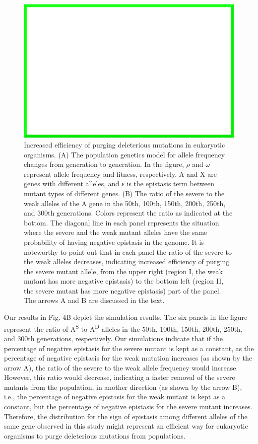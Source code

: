\begin{figure}
\centering
\includegraphics[width=\textwidth]{dummy}
\caption{Increased efficiency of purging deleterious mutations in
eukaryotic organisms. (A) The population genetics model for allele
frequency changes from generation to generation. In the figure, $\rho$
and $\omega$ represent allele frequency and fitness, respectively. A
and X are genes with different alleles, and ε is the epistasis term
between mutant types of different genes. (B) The ratio of the severe
to the weak alleles of the A gene in the 50th, 100th, 150th, 200th,
250th, and 300th generations. Colors represent the ratio as indicated
at the bottom. The diagonal line in each panel represents the
situation where the severe and the weak mutant alleles have the same
probability of having negative epistasis in the genome. It is
noteworthy to point out that in each panel the ratio of the severe to
the weak alleles decreases, indicating increased efficiency of purging
the severe mutant allele, from the upper right (region I, the weak
mutant has more negative epistasis) to the bottom left (region II, the
severe mutant has more negative epistasis) part of the panel. The
arrows A and B are discussed in the text.}
\end{figure}

Our results in Fig. 4B depict the simulation results. The six panels
in the figure represent the ratio of A\textsuperscript{S} to
A\textsuperscript{D} alleles in the 50th,
100th, 150th, 200th, 250th, and 300th generations, respectively. Our
simulations indicate that if the percentage of negative epistasis for
the severe mutant is kept as a constant, as the percentage of negative
epistasis for the weak mutation increases (as shown by the arrow A),
the ratio of the severe to the weak allele frequency would
increase. However, this ratio would decrease, indicating a faster
removal of the severe mutants from the population, in another
direction (as shown by the arrow B), i.e., the percentage of negative
epistasis for the weak mutant is kept as a constant, but the
percentage of negative epistasis for the severe mutant
increases. Therefore, the distribution for the sign of epistasis among
different alleles of the same gene observed in this study might
represent an efficient way for eukaryotic organisms to purge
deleterious mutations from populations.

